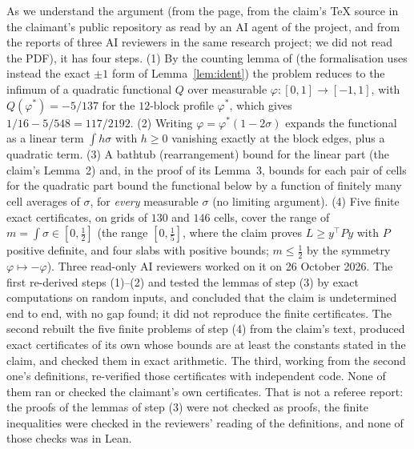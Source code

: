 \documentclass[11pt]{amsart}
\theoremstyle{remark}
\begin{document}
As we understand the argument (from the page, from the claim's TeX source in the claimant's public repository as read by an AI agent of the project, and from the reports of three AI reviewers in the same research project; we did not read the PDF), it has four steps. (1) By the counting lemma of \cite{PRS08} (the formalisation uses instead the exact $\pm1$ form of Lemma~\ref{lem:ident}) the problem reduces to the infimum of a quadratic functional $Q$ over measurable
$\varphi\colon[0,1]\to[-1,1]$, with $Q(\varphi^*)=-5/137$ for the $12$-block profile $\varphi^*$, which gives $1/16-5/548=117/2192$. (2) Writing $\varphi=\varphi^*(1-2\sigma)$ expands the functional as a linear term $\int h\sigma$ with $h\ge0$ vanishing exactly at the block edges, plus a quadratic term. (3) A bathtub (rearrangement)
bound for the linear part (the claim's Lemma~2) and, in the proof of its Lemma~3, bounds for each pair of cells for the quadratic part bound the functional below by a function of finitely many cell averages of $\sigma$, for \emph{every} measurable $\sigma$ (no limiting argument). (4) Five finite exact certificates, on grids of $130$ and $146$ cells, cover the range of $m=\int\sigma\in[0,\frac12]$ (the range $[0,\frac15]$, where the claim proves $L\ge y^\top Py$ with $P$ positive definite, and four slabs with positive bounds; $m\le\frac12$ by the symmetry $\varphi\mapsto-\varphi$).
Three read-only AI reviewers worked on it on 26 October 2026. The first re-derived steps (1)--(2) and tested the lemmas of step (3) by exact computations on random inputs, and concluded that the claim is undetermined end to end, with no gap found; it did not reproduce the finite certificates.
The second rebuilt the five finite problems of step (4) from the claim's text, produced exact certificates of its own whose bounds are at least the constants stated in the claim, and checked them in exact arithmetic. The third, working from the second one's definitions, re-verified those certificates with independent code.
None of them ran or checked the claimant's own certificates. That is not a referee report: the proofs of the lemmas of step (3) were not checked as proofs, the finite inequalities were checked in the reviewers' reading of the definitions, and none of those checks was in Lean.
\end{document}
